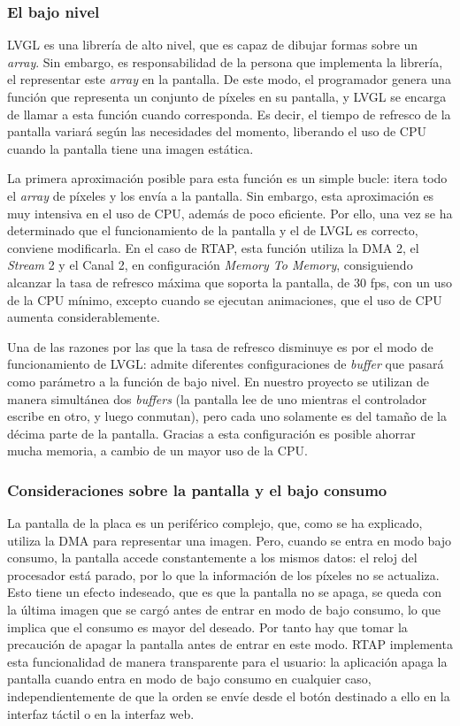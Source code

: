 \subsubsection{El bajo nivel}
LVGL es una librería de alto nivel, que es capaz de dibujar formas sobre un \textit{array}. Sin embargo, es responsabilidad de la persona que implementa la librería, el representar este \textit{array} en la pantalla. De este modo, el programador genera una función que representa un conjunto de píxeles en su pantalla, y LVGL se encarga de llamar a esta función cuando corresponda. Es decir, el tiempo de refresco de la pantalla variará según las necesidades del momento, liberando el uso de CPU cuando la pantalla tiene una imagen estática.

La primera aproximación posible para esta función es un simple bucle: itera todo el \textit{array} de píxeles y los envía a la pantalla. Sin embargo, esta aproximación es muy intensiva en el uso de CPU, además de poco eficiente. Por ello, una vez se ha determinado que el funcionamiento de la pantalla y el de LVGL es correcto, conviene modificarla. En el caso de RTAP, esta función utiliza la DMA 2, el \textit{Stream} 2 y el Canal 2, en configuración \textit{Memory To Memory}, consiguiendo alcanzar la tasa de refresco máxima que soporta la pantalla, de 30 fps, con un uso de la CPU mínimo, excepto cuando se ejecutan animaciones, que el uso de CPU aumenta considerablemente.

Una de las razones por las que la tasa de refresco disminuye es por el modo de funcionamiento de LVGL: admite diferentes configuraciones de \textit{buffer} que pasará como parámetro a la función de bajo nivel. En nuestro proyecto se utilizan de manera simultánea dos \textit{buffers} (la pantalla lee de uno mientras el controlador escribe en otro, y luego conmutan), pero cada uno solamente es del tamaño de la décima parte de la pantalla. Gracias a esta configuración es posible ahorrar mucha memoria, a cambio de un mayor uso de la CPU.

\subsubsection{Consideraciones sobre la pantalla y el bajo consumo}
La pantalla de la placa es un periférico complejo, que, como se ha explicado, utiliza la DMA para representar una imagen. Pero, cuando se entra en modo bajo consumo, la pantalla accede constantemente a los mismos datos: el reloj del procesador está parado, por lo que la información de los píxeles no se actualiza. Esto tiene un efecto indeseado, que es que la pantalla no se apaga, se queda con la última imagen que se cargó antes de entrar en modo de bajo consumo, lo que implica que el consumo es mayor del deseado. Por tanto hay que tomar la precaución de apagar la pantalla antes de entrar en este modo. RTAP implementa esta funcionalidad de manera transparente para el usuario: la aplicación apaga la pantalla cuando entra en modo de bajo consumo en cualquier caso, independientemente de que la orden se envíe desde el botón destinado a ello en la interfaz táctil o en la interfaz web.

